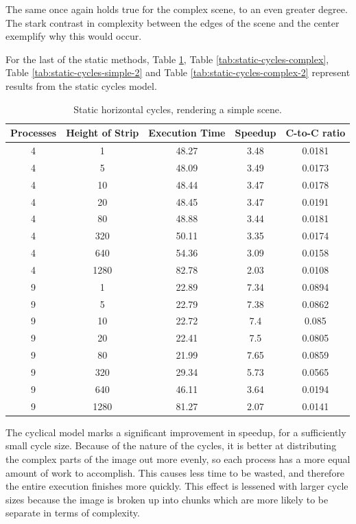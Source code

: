 \documentclass[CMPE]{KGCOEReport}
\begin{document}
The same once again holds true for the complex scene, to an even greater degree. The 
stark contrast in complexity between the edges of the scene and the center 
exemplify why this would occur.

For the last of the static methods, Table \ref{tab:static-cycles-simple}, 
Table \ref{tab:static-cycles-complex}, Table \ref{tab:static-cycles-simple-2} and 
Table \ref{tab:static-cycles-complex-2} represent results from the static cycles model.

\begin{table}[!htpb]
\centering
\caption{Static horizontal cycles, rendering a simple scene.}
\label{tab:static-cycles-simple}
\begin{tabular}{ccccc}
\hline
\multicolumn{1}{l}{Processes} &
  \multicolumn{1}{l}{Height of Strip} &
  \multicolumn{1}{l}{Execution Time} &
  \multicolumn{1}{l}{Speedup} &
  \multicolumn{1}{l}{C-to-C ratio} \\ \hline
4 & 1    & 48.27 & 3.48 & 0.0181  \\
4 & 5    & 48.09 & 3.49 & 0.0173  \\
4 & 10   & 48.44 & 3.47 & 0.0178  \\
4 & 20   & 48.45 & 3.47 & 0.0191  \\
4 & 80   & 48.88 & 3.44 & 0.0181  \\
4 & 320  & 50.11 & 3.35 & 0.0174  \\ 
4 & 640  & 54.36 & 3.09 & 0.0158  \\
4 & 1280 & 82.78 & 2.03 & 0.0108  \\ \hline
9 & 1    & 22.89 & 7.34 & 0.0894  \\
9 & 5    & 22.79 & 7.38 & 0.0862  \\
9 & 10   & 22.72 & 7.4  & 0.085   \\
9 & 20   & 22.41 & 7.5  & 0.0805  \\
9 & 80   & 21.99 & 7.65 & 0.0859  \\
9 & 320  & 29.34 & 5.73 & 0.0565  \\
9 & 640  & 46.11 & 3.64 & 0.0194  \\
9 & 1280 & 81.27 & 2.07 & 0.0141 
\end{tabular}
\end{table}

The cyclical model marks a significant improvement in speedup, for a sufficiently 
small cycle size. Because of the nature of the cycles, it is better at distributing 
the complex parts of the image out more evenly, so each process has a more equal 
amount of work to accomplish. This causes less time to be wasted, and therefore 
the entire execution finishes more quickly. This effect is lessened with larger 
cycle sizes because the image is broken up into chunks which are more likely to 
be separate in terms of complexity.
\end{document}
